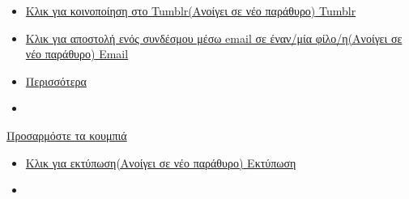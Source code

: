 \documentclass[
]{article}
\providecommand{\tightlist}{%
  \setlength{\itemsep}{0pt}\setlength{\parskip}{0pt}}
\begin{document}
\begin{itemize}
{{  για κοινοποίηση στο Pinterest(Ανοίγει σε νέο παράθυρο)} {Pinterest}}
\item
  \href{https://aftermathsgr.wordpress.com/2024/08/04/\%cf\%84\%ce\%b1-\%ce\%bf\%ce\%bb\%cf\%85\%ce\%bc\%cf\%80\%ce\%b9\%ce\%b1\%ce\%ba\%ce\%ac-\%cf\%85\%ce\%b4\%cf\%81\%ce\%bf\%ce\%b8\%ce\%b5\%cf\%81\%ce\%bc\%ce\%b9\%ce\%ba\%ce\%ad\%cf\%82-\%cf\%83\%cf\%85\%ce\%bd\%ce\%b1\%cf\%81\%cf\%84\%ce\%ae\%cf\%83\%ce\%b5/?share=tumblr}{\protect\hypertarget{sharing-tumblr-13786}{}{Κλικ
  για κοινοποίηση στο Tumblr(Ανοίγει σε νέο παράθυρο)} {Tumblr}}
\item
  \href{mailto:?subject=\%5B\%CE\%94\%CE\%B9\%CE\%B1\%CE\%BC\%CE\%BF\%CE\%B9\%CF\%81\%CE\%B1\%CF\%83\%CE\%BC\%CE\%AD\%CE\%BD\%CE\%B7\%20\%CE\%B4\%CE\%B7\%CE\%BC\%CE\%BF\%CF\%83\%CE\%AF\%CE\%B5\%CF\%85\%CF\%83\%CE\%B7\%5D\%20\%CE\%A4\%CE\%B1\%20\%CE\%9F\%CE\%BB\%CF\%85\%CE\%BC\%CF\%80\%CE\%B9\%CE\%B1\%CE\%BA\%CE\%AC\%3A\%20\%CE\%A5\%CE\%B4\%CF\%81\%CE\%BF\%CE\%B8\%CE\%B5\%CF\%81\%CE\%BC\%CE\%B9\%CE\%BA\%CE\%AD\%CF\%82\%20\%CE\%A3\%CF\%85\%CE\%BD\%CE\%B1\%CF\%81\%CF\%84\%CE\%AE\%CF\%83\%CE\%B5\%CE\%B9\%CF\%82\%3B\&body=https\%3A\%2F\%2Faftermathsgr.wordpress.com\%2F2024\%2F08\%2F04\%2F\%25cf\%2584\%25ce\%25b1-\%25ce\%25bf\%25ce\%25bb\%25cf\%2585\%25ce\%25bc\%25cf\%2580\%25ce\%25b9\%25ce\%25b1\%25ce\%25ba\%25ce\%25ac-\%25cf\%2585\%25ce\%25b4\%25cf\%2581\%25ce\%25bf\%25ce\%25b8\%25ce\%25b5\%25cf\%2581\%25ce\%25bc\%25ce\%25b9\%25ce\%25ba\%25ce\%25ad\%25cf\%2582-\%25cf\%2583\%25cf\%2585\%25ce\%25bd\%25ce\%25b1\%25cf\%2581\%25cf\%2584\%25ce\%25ae\%25cf\%2583\%25ce\%25b5\%2F\&share=email}{\protect\hypertarget{sharing-email-13786}{}{Κλικ
  για αποστολή ενός συνδέσμου μέσω email σε έναν/μία φίλο/η(Ανοίγει σε
  νέο παράθυρο)} {Email}}
\item
  \protect\hyperlink{}{{Περισσότερα}}
\item
\end{itemize}

\href{https://aftermathsgr.wordpress.com/wp-admin/options-general.php?page=sharing}{Προσαρμόστε
τα κουμπιά}

\begin{itemize}
\tightlist
\item
  \href{https://aftermathsgr.wordpress.com/2024/08/04/\%cf\%84\%ce\%b1-\%ce\%bf\%ce\%bb\%cf\%85\%ce\%bc\%cf\%80\%ce\%b9\%ce\%b1\%ce\%ba\%ce\%ac-\%cf\%85\%ce\%b4\%cf\%81\%ce\%bf\%ce\%b8\%ce\%b5\%cf\%81\%ce\%bc\%ce\%b9\%ce\%ba\%ce\%ad\%cf\%82-\%cf\%83\%cf\%85\%ce\%bd\%ce\%b1\%cf\%81\%cf\%84\%ce\%ae\%cf\%83\%ce\%b5/\#print?share=print}{\protect\hypertarget{sharing-print-13786}{}{Κλικ
  για εκτύπωση(Ανοίγει σε νέο παράθυρο)} {Εκτύπωση}}
\item
\end{itemize}
\end{document}
